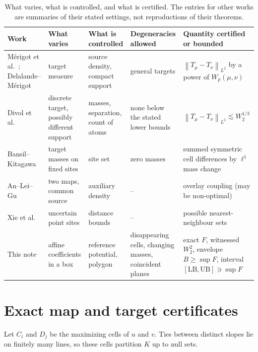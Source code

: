 \documentclass[11pt]{article}
\theoremstyle{remark}
\newcommand{\norm}[1]{\left\lVert#1\right\rVert}
\begin{document}
\begin{table}[tbp]
\centering\small
\begin{tabular}{@{}>{\raggedright}p{2.6cm}>{\raggedright}p{2.6cm}>{\raggedright}p{2.6cm}>{\raggedright}p{2.6cm}p{3.6cm}@{}}
\toprule
Work & What varies & What is controlled & Degeneracies allowed & Quantity certified or bounded\\
\midrule
M\'erigot et al.\ \cite{MDC}; Delalande--M\'erigot \cite{DM} & target measure & source density, compact support & general targets & $\norm{T_\mu-T_\nu}_{L^2}$ by a power of $W_p(\mu,\nu)$\\
Divol et al.\ \cite{DNP} & discrete target, possibly different support & masses, separation, count of atoms & none below the stated lower bounds & $\norm{T_\mu-T_\nu}_{L^2}\lesssim W_2^{1/3}$\\
Bansil--Kitagawa \cite{BK} & target masses on fixed sites & site set & zero masses & summed symmetric cell differences by $\ell^1$ mass change\\
An--Lei--Gu \cite{ALG} & two maps, common source & auxiliary density & -- & overlay coupling (may be non-optimal)\\
Xie et al.\ \cite{Xie} & uncertain point sites & distance bounds & -- & possible nearest-neighbour sets\\
This note & affine coefficients in a box & reference potential, polygon & disappearing cells, changing masses, coincident planes & exact $F$, witnessed $W_2^2$, envelope $B\ge\sup F$, interval $[\mathrm{LB},\mathrm{UB}]\ni\sup F$\\
\bottomrule
\end{tabular}
\caption{What varies, what is controlled, and what is certified. The entries for other works are summaries of their stated settings, not reproductions of their theorems.}
\label{tab:compare}
\end{table}

\section{Exact map and target certificates}
Let $C_i$ and $D_j$ be the maximizing cells of $u$ and $v$. Ties between
distinct slopes lie on finitely many lines, so these cells partition $K$
up to null sets.
\end{document}
